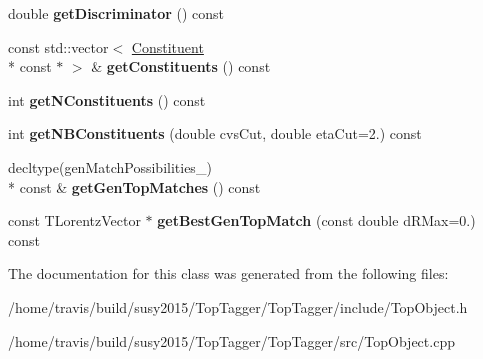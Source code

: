 \begin{DoxyCompactItemize}
\item 
\hypertarget{classTopObject_a144b61f5139eb1bef7bc00cee17deaf7}{double {\bfseries get\-Discriminator} () const }\label{classTopObject_a144b61f5139eb1bef7bc00cee17deaf7}

\item 
\hypertarget{classTopObject_a3bd54d089da20318d1733c2d4e28493a}{const std\-::vector$<$ \hyperlink{classConstituent}{Constituent} \\*
const $\ast$ $>$ \& {\bfseries get\-Constituents} () const }\label{classTopObject_a3bd54d089da20318d1733c2d4e28493a}

\item 
\hypertarget{classTopObject_a562bafee171bf66c283d519c8021672d}{int {\bfseries get\-N\-Constituents} () const }\label{classTopObject_a562bafee171bf66c283d519c8021672d}

\item 
\hypertarget{classTopObject_a2b5bb6b014c80262b748171698ba1042}{int {\bfseries get\-N\-B\-Constituents} (double cvs\-Cut, double eta\-Cut=2.) const }\label{classTopObject_a2b5bb6b014c80262b748171698ba1042}

\item 
\hypertarget{classTopObject_a51cc6fbaacb2cf502cad0b57d99ae91f}{decltype(gen\-Match\-Possibilities\-\_\-) \\*
const \& {\bfseries get\-Gen\-Top\-Matches} () const }\label{classTopObject_a51cc6fbaacb2cf502cad0b57d99ae91f}

\item 
\hypertarget{classTopObject_a80c459ce3d60d1402087ceead3999e45}{const T\-Lorentz\-Vector $\ast$ {\bfseries get\-Best\-Gen\-Top\-Match} (const double d\-R\-Max=0.) const }\label{classTopObject_a80c459ce3d60d1402087ceead3999e45}

\end{DoxyCompactItemize}


The documentation for this class was generated from the following files\-:\begin{DoxyCompactItemize}
\item 
/home/travis/build/susy2015/\-Top\-Tagger/\-Top\-Tagger/include/Top\-Object.\-h\item 
/home/travis/build/susy2015/\-Top\-Tagger/\-Top\-Tagger/src/Top\-Object.\-cpp\end{DoxyCompactItemize}
